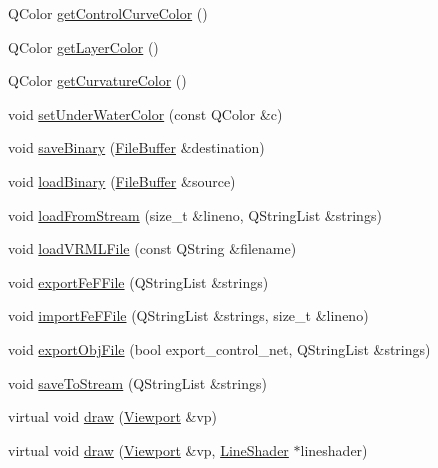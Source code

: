 \begin{DoxyCompactItemize}
\item 
Q\-Color \hyperlink{classShipCAD_1_1SubdivisionSurface_a5b35353f739d224d8aa40ff19333ba98}{get\-Control\-Curve\-Color} ()
\item 
Q\-Color \hyperlink{classShipCAD_1_1SubdivisionSurface_a2a5e9c50d43e72829e02a8c0be31c260}{get\-Layer\-Color} ()
\item 
Q\-Color \hyperlink{classShipCAD_1_1SubdivisionSurface_aa39747141685b52d3987cf6c9f4e2aa8}{get\-Curvature\-Color} ()
\item 
void \hyperlink{classShipCAD_1_1SubdivisionSurface_a0b6eee9984eefa4b0c3d1f229eb474ed}{set\-Under\-Water\-Color} (const Q\-Color \&c)
\item 
void \hyperlink{classShipCAD_1_1SubdivisionSurface_a6e6254ecc6fcbdadf1ff4f646caa1d59}{save\-Binary} (\hyperlink{classShipCAD_1_1FileBuffer}{File\-Buffer} \&destination)
\item 
void \hyperlink{classShipCAD_1_1SubdivisionSurface_ac8ad644e0c19ac180fd4a7368fa410a6}{load\-Binary} (\hyperlink{classShipCAD_1_1FileBuffer}{File\-Buffer} \&source)
\item 
void \hyperlink{classShipCAD_1_1SubdivisionSurface_aa7aebfa4567458829323752a96195060}{load\-From\-Stream} (size\-\_\-t \&lineno, Q\-String\-List \&strings)
\item 
void \hyperlink{classShipCAD_1_1SubdivisionSurface_add8d612c82f170869f81042520f62499}{load\-V\-R\-M\-L\-File} (const Q\-String \&filename)
\item 
void \hyperlink{classShipCAD_1_1SubdivisionSurface_ac6f3ca7c8c09acd6bc9c72ae063002bf}{export\-Fe\-F\-File} (Q\-String\-List \&strings)
\item 
void \hyperlink{classShipCAD_1_1SubdivisionSurface_aa3f1904bcec3f104cf465e3bed799406}{import\-Fe\-F\-File} (Q\-String\-List \&strings, size\-\_\-t \&lineno)
\item 
void \hyperlink{classShipCAD_1_1SubdivisionSurface_a8859af0a44d7f858d0febbd58efd2820}{export\-Obj\-File} (bool export\-\_\-control\-\_\-net, Q\-String\-List \&strings)
\item 
void \hyperlink{classShipCAD_1_1SubdivisionSurface_a77328f442672d72b4f9f1053b2cb2871}{save\-To\-Stream} (Q\-String\-List \&strings)
\item 
virtual void \hyperlink{classShipCAD_1_1SubdivisionSurface_acfe9cc964dbe05105486b43f2dc6fc4f}{draw} (\hyperlink{classShipCAD_1_1Viewport}{Viewport} \&vp)
\item 
virtual void \hyperlink{classShipCAD_1_1SubdivisionSurface_ab1c250ff9fa7acae3ecdca4575f3e259}{draw} (\hyperlink{classShipCAD_1_1Viewport}{Viewport} \&vp, \hyperlink{classShipCAD_1_1LineShader}{Line\-Shader} $\ast$lineshader)

\end{DoxyCompactItemize}
